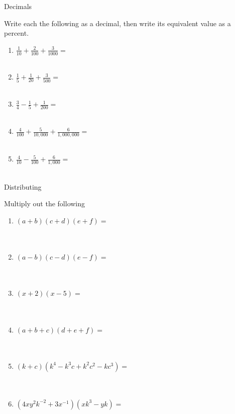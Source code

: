 \documentclass{article}
\begin{document}
	\centerline{\Large{ Decimals}}\vspace{12 pt}
Write each the following as a decimal, then write its equivalent value as a percent. 
\begin{enumerate}
\item $ \frac{1}{10} + \frac{2}{100} + \frac{3}{1000} = $ \\ \\
\item $ \frac{1}{5} + \frac{1}{20} + \frac{3}{500} = $ \\ \\
\item $ \frac{3}{4} - \frac{1}{5} + \frac{1}{200} = $ \\ \\
\item $ \frac{4}{100} + \frac{5}{10,000} + \frac{6}{1,000,000} = $ \\ \\
\item $ \frac{4}{10} - \frac{5}{100} + \frac{6}{1,000} = $ \\ \\
\end{enumerate}


	\centerline{\Large{ Distributing}}\vspace{12 pt}
Multiply out the following
\begin{enumerate}
\item $(a+b)(c+d)(e+f)=$ \\ \\ \\
\item $(a-b)(c-d)(e-f)=$ \\ \\ \\
\item $(x+2)(x-5)=$ \\ \\ \\
\item $(a+b+c)(d+e+f)=$ \\ \\ \\
\item $(k+c)(k^4-k^3c+k^2c^2-kc^3)=$ \\ \\ \\
\item $(4xy^2k^{-2} + 3x^{-1})(xk^3-yk)=$ \\ \\ \\
\end{enumerate}
\end{document}
